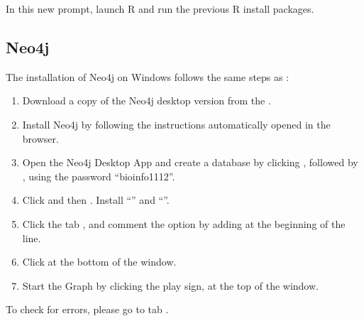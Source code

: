 \documentclass[letterpaper,10pt,english]{sphinxmanual}
\begin{document}
In this new prompt, launch R and run the previous R install packages.


\subsection{Neo4j}
\label{\detokenize{intro/getting-started-with-windows:neo4j}}
The installation of Neo4j on Windows follows the same steps as {\hyperref[\detokenize{intro/getting-started-with-neo4j:getting-started-with-neo4j}]{}}:
\begin{enumerate}
%
\item {} 
Download a copy of the Neo4j desktop version from the .

\item {} 
Install Neo4j by following the instructions automatically opened in the browser.

\item {} 
Open the Neo4j Desktop App and create a database by clicking , followed by , using the password “bioinfo1112”.

\item {} 
Click  and then . Install “” and “”.

\item {} 
Click the tab , and comment the option  by adding \sphinxcode{\sphinxupquote{\#}} at the beginning of the line.

\item {} 
Click  at the bottom of the window.

\item {} 
Start the Graph by clicking the play sign, at the top of the window.

\end{enumerate}

To check for errors, please go to tab .
\end{document}
